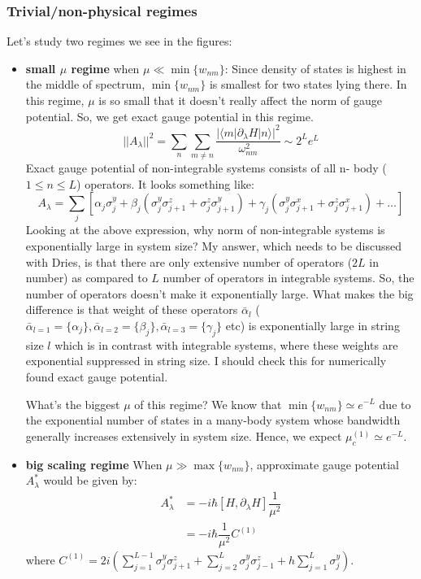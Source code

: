 \documentclass[11pt,a4paper]{article}
\begin{document}
\subsubsection*{Trivial/non-physical regimes}
 Let's study two regimes we see in the figures: 
\begin{itemize}
\item \textbf{small $\mu$ regime} when $\mu \ll \min\{w_{nm}\}$: Since density of states is highest in the middle of spectrum, $\min\{w_{nm}\}$ is smallest for two states lying there.  In this regime, $\mu$ is so small that it doesn't really affect the norm of gauge potential. So, we get exact gauge potential in this regime.
\begin{equation}
||A_{\lambda}||^2 = \sum_n \sum_{m \neq n}  \dfrac{|\langle m | \partial_{\lambda}H| n \rangle|^2}{\omega_{nm}^2}  \sim 2^Le^L
\end{equation}
Exact gauge potential of non-integrable systems consists of all n- body ($1 \leq n \leq L$) operators. It looks something like:
\begin{equation}
A_{\lambda} = \sum_j [\alpha_j \sigma_j^y + \beta_j ( \sigma_j^y  \sigma_{j+1}^z + \sigma_j^z  \sigma_{j+1}^y ) + \gamma_j ( \sigma_j^y  \sigma_{j+1}^x + \sigma_j^z  \sigma_{j+1}^x ) + \ldots]
\end{equation} 
Looking at the above expression, why norm  of non-integrable systems is exponentially large in system size? My answer, which needs to be discussed with Dries, is that there are only extensive number of operators ($2 L$ in number) as compared to $L$ number of operators in integrable systems. So, the number of operators doesn't make it exponentially large. What makes the big difference is that weight of these operators $\bar{\alpha}_l$ ($ \bar{\alpha}_{l=1}= \{\alpha_j\}, \bar{\alpha}_{l=2}= \{\beta_j\}, \bar{\alpha}_{l=3}=  \{\gamma_j\}$ etc) is exponentially large in string size $l$ which is in contrast with integrable systems, where these weights are exponential suppressed in string size. I should check this for numerically found exact gauge potential.

What's the biggest $\mu$ of this regime? We know that $\min\{w_{nm}\} \simeq e^{-L}$  due to the exponential number of states in a many-body system whose bandwidth generally increases extensively in system size. Hence, we expect $\mu_c^{(1)} \simeq e^{-L}$. 



\item \textbf{big scaling regime} 
When $\mu \gg \max\{w_{nm}\}$, approximate gauge potential $A_{\lambda}^*$ would be given by:
\begin{align*}
A_{\lambda}^* & =  -i \hbar [H,\partial_{\lambda}H ]\dfrac{1}{\mu^2}  \\
& =  -i \hbar \dfrac{1}{\mu^2} C^{(1)}
\end{align*}
where $ C^{(1)}=2i \left(\sum_{j=1}^{L-1} \sigma_j^y \sigma_{j+1}^z + \sum_{j=2}^{L} \sigma_j^y \sigma_{j-1}^z + h \sum_{j=1}^{L}\sigma_j^y \right) $.



\end{itemize}
\end{document}
